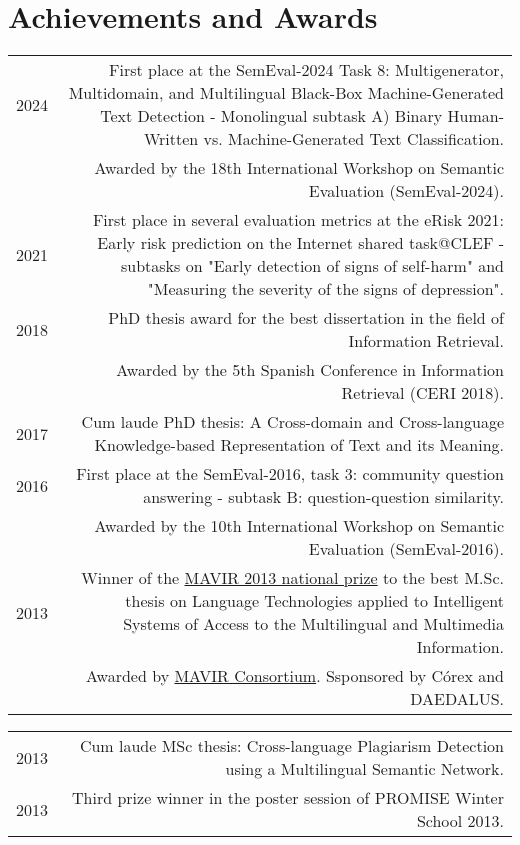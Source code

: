 \documentclass[10pt]{article}
\begin{document}
\section*{Achievements and Awards}
\begin{tabular}{L!{\VRule}R}
	2024 & First place at the SemEval-2024 Task 8: Multigenerator, Multidomain, and Multilingual Black-Box Machine-Generated Text Detection - Monolingual subtask A) Binary Human-Written vs. Machine-Generated Text Classification.\\\
    &\scriptsize{Awarded by the 18th International Workshop on Semantic Evaluation (SemEval-2024).}\vspace{5pt}\\
	2021 & First place in several evaluation metrics at the eRisk 2021: Early risk prediction on the Internet shared task@CLEF - subtasks on "Early detection of signs of self-harm" and "Measuring the severity of the signs of depression".\vspace{5pt}\\
	2018 & PhD thesis award for the best dissertation in the field of Information Retrieval.\\
	&\scriptsize{Awarded by the 5th Spanish Conference in Information Retrieval (CERI 2018).}\vspace{5pt}\\
	2017 & Cum laude PhD thesis: A Cross-domain and Cross-language Knowledge-based Representation of Text and its Meaning.\vspace{5pt}\\
	2016 & First place at the SemEval-2016, task 3: community question answering - subtask B: question-question similarity.\\
     &\scriptsize{Awarded by the 10th International Workshop on Semantic Evaluation (SemEval-2016).}\vspace{5pt}\\
	2013 & Winner of the \href{}{MAVIR 2013 national prize} to the best M.Sc. thesis on Language Technologies applied to Intelligent Systems of Access
	to the Multilingual and Multimedia Information.\\
	&\scriptsize{Awarded by \href{}{MAVIR Consortium}. Ssponsored by C{\'o}rex and DAEDALUS.}\vspace{5pt}\\
     \end{tabular}
     
       \begin{tabular}{L!{\VRule}R}
        2013 & Cum laude MSc thesis: Cross-language Plagiarism Detection using a Multilingual Se\-man\-tic Network.\vspace{5pt}\\
	2013 & Third prize winner in the poster session of PROMISE Winter School 2013.\vspace{5pt}\\
\end{tabular}
\end{document}
